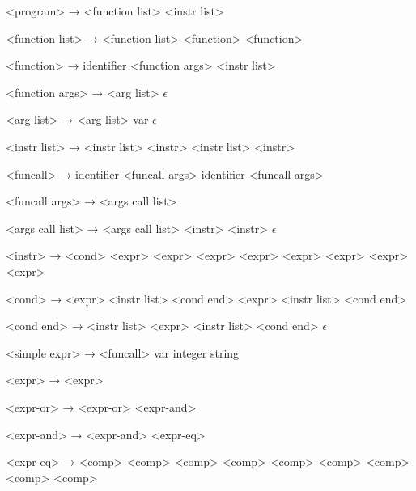 ﻿<program>        →  <function list> <instr list>

<function list>  → <function list> <function>
                 \alt <function>

<function>       →  identifier <function args>
                   \lit{\{} <instr list> \lit{\}}

<function args>  → \lit{(} <arg list> \lit{)}
                 \alt $\epsilon$

<arg list>       → <arg list> \lit{,} var
                 \alt $\epsilon$

<instr list>     → <instr list> <instr> \lit{;}
                 \alt \lit{\{} <instr list> \lit{\}}
                 \alt <instr> \lit{;}

<funcall>        → \lit{\&} identifier <funcall args> 
                 \alt identifier <funcall args> 

<funcall args>   → \lit{(} <args call list> \lit{)}

<args call list> → <args call list> \lit{,} <instr>
                 \alt <instr>
                 \alt $\epsilon$

<instr>          → <cond>
                 \alt <expr>
                 \alt <expr> \lit{=} <expr>
                 \alt <expr>  <expr>
                 \alt <expr>  <expr>
                 \alt {} <expr>

<cond>           →  <expr> \lit{\{} <instr list> \lit{\}} <cond end>
                 \alt {} <expr> \lit{\{} <instr list> \lit{\}} <cond end>

<cond end>       →  \lit{\{} <instr list> \lit{\}}
                 \alt {} <expr> \lit{\{} <instr list> \lit{\}} <cond end>
                 \alt $\epsilon$

<simple expr>    → <funcall>
                 \alt var
                 \alt integer
                 \alt string

<expr>           →  <expr>

<expr-or>        → <expr-or> \lit{||} <expr-and>

<expr-and>       → <expr-and> \lit{\&\&} <expr-eq>

<expr-eq>        → <comp> \lit{==} <comp>
                 \alt <comp> \lit{!=} <comp>
                 \alt <comp>  <comp>
                 \alt <comp>  <comp>
                 \alt <comp>

